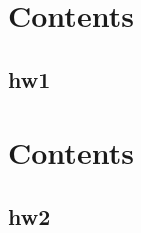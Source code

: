 \section{Contents}
    \subsection{hw1}
            
\section{Contents}
    \subsection{hw2}
            
    
    